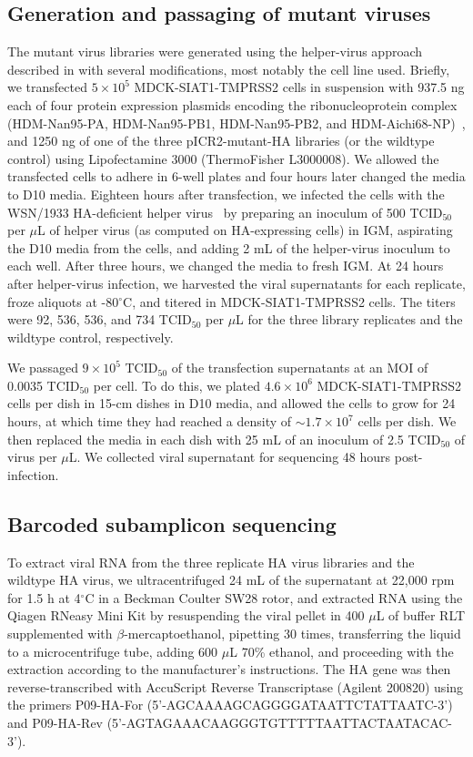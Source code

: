\documentclass[9pt,twocolumn,twoside]{pnas-new}
\begin{document}
{\subsection*{Generation and passaging of mutant viruses}
The mutant virus libraries were generated using the helper-virus approach described in \cite{doud2016accurate} with several modifications, most notably the cell line used.
Briefly, we transfected $5 \times 10^5$ MDCK-SIAT1-TMPRSS2 cells in suspension with 937.5 ng each of four protein expression plasmids encoding the ribonucleoprotein complex (HDM-Nan95-PA, HDM-Nan95-PB1, HDM-Nan95-PB2, and HDM-Aichi68-NP)~\cite{gong2013stability}, and 1250 ng of one of the three pICR2-mutant-HA libraries (or the wildtype control) using Lipofectamine 3000 (ThermoFisher L3000008).
We allowed the transfected cells to adhere in 6-well plates and four hours later changed the media to D10 media.
Eighteen hours after transfection, we infected the cells with the WSN/1933 HA-deficient helper virus~\cite{doud2016accurate} by preparing an inoculum of 500 TCID$_{50}$ per $\mu$L of helper virus (as computed on HA-expressing cells) in IGM, aspirating the D10 media from the cells, and adding 2 mL of the helper-virus inoculum to each well.
After three hours, we changed the media to fresh IGM.
At 24 hours after helper-virus infection, we harvested the viral supernatants for each replicate, froze aliquots at -80$^{\circ}$C, and titered in MDCK-SIAT1-TMPRSS2 cells.
The titers were 92, 536, 536, and 734 TCID$_{50}$ per $\mu$L for the three library replicates and the wildtype control, respectively.

We passaged $9 \times 10^5$ TCID$_{50}$ of the transfection supernatants at an MOI of 0.0035 TCID$_{50}$ per cell.
To do this, we plated $4.6 \times 10^6$ MDCK-SIAT1-TMPRSS2 cells per dish in 15-cm dishes in D10 media, and allowed the cells to grow for 24 hours, at which time they had reached a density of $\sim 1.7 \times 10^7$ cells per dish.
We then replaced the media in each dish with 25 mL of an inoculum of 2.5 TCID$_{50}$ of virus per $\mu$L.
We collected viral supernatant for sequencing 48 hours post-infection.

\subsection*{Barcoded subamplicon sequencing}
To extract viral RNA from the three replicate HA virus libraries and the wildtype HA virus, we ultracentrifuged 24 mL of the supernatant at 22,000 rpm for 1.5 h at 4$^{\circ}$C in a Beckman Coulter SW28 rotor, and extracted RNA using the Qiagen RNeasy Mini Kit by resuspending the viral pellet in 400 $\mu$L of buffer RLT supplemented with $\beta$-mercaptoethanol, pipetting 30 times, transferring the liquid to a microcentrifuge tube, adding 600 $\mu$L 70\% ethanol, and proceeding with the extraction according to the manufacturer's instructions.
The HA gene was then reverse-transcribed with AccuScript Reverse Transcriptase (Agilent 200820) using the primers P09-HA-For (5'-AGCAAAAGCAGGGGATAATTCTATTAATC-3') and P09-HA-Rev (5'-AGTAGAAACAAGGGTGTTTTTAATTACTAATACAC-3').

}
\end{document}
